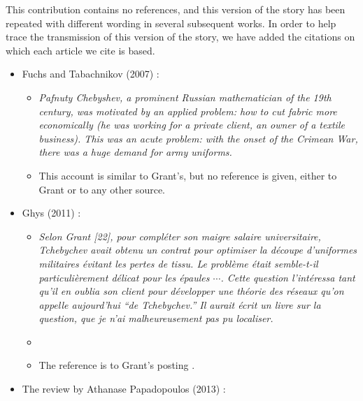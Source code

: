 \documentclass[12pt]{article}
\begin{document}
This contribution contains no references, and this version of the story has been repeated with different wording in several subsequent works. In order to help trace the transmission of this version of the story, we have added the citations on which each article we cite is based.

\begin{itemize}

\item[]Fuchs and Tabachnikov (2007) \cite{Fuchs2007}:

\begin{itemize}

\item[]{\it Pafnuty Chebyshev, a prominent Russian mathematician of the 19th century, was motivated by an applied problem: how to cut fabric more economically (he was working for a private client, an owner of a textile business). This was an acute problem: with the onset of the Crimean War, there was a huge demand for army uniforms.}

\item[$\bullet$]This account is similar to Grant's, but no reference is given, either to Grant or to any other source.

\end{itemize}

\item[]Ghys (2011) \cite{Ghys2011}:

\begin{itemize}

\item[]{\it Selon Grant [22], pour compl\'eter son maigre salaire universitaire, Tche\-bychev avait obtenu un contrat pour optimiser la d\'ecoupe d'uniformes militaires \'evitant les pertes de tissu. Le probl\`eme \'etait semble-t-il particuli\`erement d\'elicat pour les \'epaules $\cdots$. Cette question l'int\'eressa tant qu'il en oublia son client pour d\'evelopper une th\'eorie des r\'eseaux qu'on appelle aujourd'hui ``de Tchebychev.'' Il aurait \'ecrit un livre sur la question, que je n'ai malheureusement pas pu localiser.}

\item[]

\item[$\bullet$]The reference is to Grant's posting \cite{Grant1996}.

\end{itemize}

\item[]The review by Athanase Papadopoulos (2013) \cite{Papadopoulos2013}:


\end{itemize}
\end{document}

